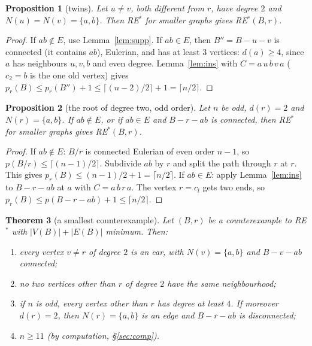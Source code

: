 \documentclass[11pt]{amsart}
\newtheorem{theorem}{Theorem}[section]
\newtheorem{proposition}[theorem]{Proposition}
\theoremstyle{definition}
\newcommand{\pr}{p_r}
\begin{document}
\begin{proposition}[twins]\label{prop:twin}
Let $u\ne v$, both different from $r$, have degree $2$ and $N(u)=N(v)=\{a,b\}$. Then RE$^*$ for smaller
graphs gives RE$^*(B,r)$.
\end{proposition}

\begin{proof}
If $ab\notin E$, use Lemma~\ref{lem:supp}. If $ab\in E$, then $B''=B-u-v$ is connected (it contains $ab$),
Eulerian, and has at least $3$ vertices: $d(a)\ge 4$, since $a$ has neighbours $u,v,b$ and even degree.
Lemma~\ref{lem:ins} with $C=a\,u\,b\,v\,a$ ($c_2=b$ is the one old vertex) gives
$\pr(B)\le\pr(B'')+1\le\lceil(n-2)/2\rceil+1=\lceil n/2\rceil$.
\end{proof}

\begin{proposition}[the root of degree two, odd order]\label{prop:root}
Let $n$ be odd, $d(r)=2$ and $N(r)=\{a,b\}$. If $ab\notin E$, or if $ab\in E$ and $B-r-ab$ is connected,
then RE$^*$ for smaller graphs gives RE$^*(B,r)$.
\end{proposition}

\begin{proof}
If $ab\notin E$: $B/r$ is connected Eulerian of even order $n-1$, so $p(B/r)\le\lceil(n-1)/2\rceil$.
Subdivide $ab$ by $r$ and split the path through $r$ at $r$. This gives
$\pr(B)\le (n-1)/2+1=\lceil n/2\rceil$.
If $ab\in E$: apply Lemma~\ref{lem:ins} to $B-r-ab$ at $a$ with $C=a\,b\,r\,a$. The vertex $r=c_l$ gets two
ends, so $\pr(B)\le p(B-r-ab)+1\le\lceil n/2\rceil$.
\end{proof}

\begin{theorem}[a smallest counterexample]\label{thm:min}
Let $(B,r)$ be a counterexample to RE$^*$ with $|V(B)|+|E(B)|$ minimum. Then:
\begin{enumerate}[label=(\alph*)]
\item every vertex $v\ne r$ of degree $2$ is an ear, with $N(v)=\{a,b\}$ and $B-v-ab$ connected;
\item no two vertices other than $r$ of degree $2$ have the same neighbourhood;
\item if $n$ is odd, every vertex other than $r$ has degree at least $4$. If moreover $d(r)=2$, then
$N(r)=\{a,b\}$ is an edge and $B-r-ab$ is disconnected;
\item $n\ge 11$ (by computation, \S\ref{sec:comp}).
\end{enumerate}
\end{theorem}
\end{document}
